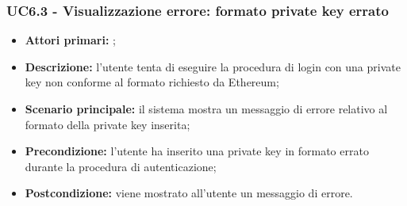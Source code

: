 \subsubsection{UC6.3 - Visualizzazione errore: formato private key errato}
\begin{itemize}
	\item \textbf{Attori primari:} \una{};
	\item \textbf{Descrizione:} l’utente tenta di eseguire la procedura di login con una private key non conforme al formato richiesto da Ethereum; 
	\item \textbf{Scenario principale:} il sistema mostra un messaggio di errore relativo al formato della private key inserita;
	\item \textbf{Precondizione:} l'utente ha inserito una private key in formato errato durante la procedura di autenticazione;
	\item \textbf{Postcondizione:} viene mostrato all’utente un messaggio di errore. 
\end{itemize}